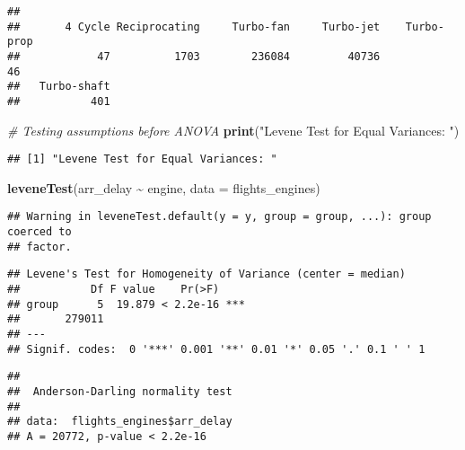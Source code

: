 \documentclass[
]{article}
\newenvironment{Shaded}{\begin{snugshade}}{\end{snugshade}}
\newcommand{\AttributeTok}[1]{\textcolor[rgb]{0.13,0.29,0.53}{#1}}
\newcommand{\CommentTok}[1]{\textcolor[rgb]{0.56,0.35,0.01}{\textit{#1}}}
\newcommand{\FunctionTok}[1]{\textcolor[rgb]{0.13,0.29,0.53}{\textbf{#1}}}
\newcommand{\NormalTok}[1]{#1}
\newcommand{\SpecialCharTok}[1]{\textcolor[rgb]{0.81,0.36,0.00}{\textbf{#1}}}
\newcommand{\StringTok}[1]{\textcolor[rgb]{0.31,0.60,0.02}{#1}}
\begin{document}
\begin{verbatim}
## 
##       4 Cycle Reciprocating     Turbo-fan     Turbo-jet    Turbo-prop 
##            47          1703        236084         40736            46 
##   Turbo-shaft 
##           401
\end{verbatim}

\begin{Shaded}
\begin{Highlighting}[]
\CommentTok{\# Testing assumptions before ANOVA}
\FunctionTok{print}\NormalTok{(}\StringTok{"Levene Test for Equal Variances: "}\NormalTok{)}
\end{Highlighting}
\end{Shaded}

\begin{verbatim}
## [1] "Levene Test for Equal Variances: "
\end{verbatim}

\begin{Shaded}
\begin{Highlighting}[]
\FunctionTok{leveneTest}\NormalTok{(arr\_delay }\SpecialCharTok{\textasciitilde{}}\NormalTok{ engine, }\AttributeTok{data =}\NormalTok{ flights\_engines)}
\end{Highlighting}
\end{Shaded}

\begin{verbatim}
## Warning in leveneTest.default(y = y, group = group, ...): group coerced to
## factor.
\end{verbatim}

\begin{verbatim}
## Levene's Test for Homogeneity of Variance (center = median)
##           Df F value    Pr(>F)    
## group      5  19.879 < 2.2e-16 ***
##       279011                      
## ---
## Signif. codes:  0 '***' 0.001 '**' 0.01 '*' 0.05 '.' 0.1 ' ' 1
\end{verbatim}

\begin{Shaded}
\end{Shaded}

\begin{verbatim}
## 
##  Anderson-Darling normality test
## 
## data:  flights_engines$arr_delay
## A = 20772, p-value < 2.2e-16
\end{verbatim}
\end{document}
